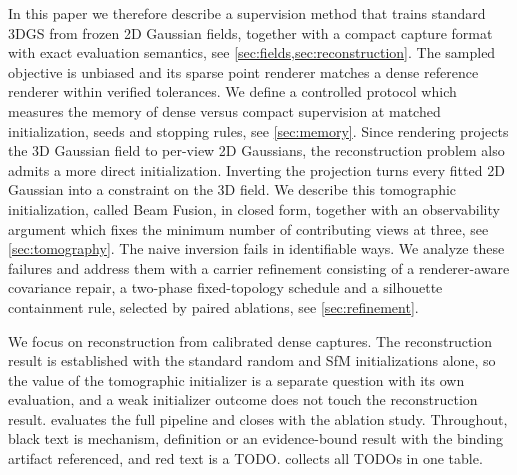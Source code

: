 In this paper we therefore describe a supervision method that trains standard 3DGS from
frozen 2D Gaussian fields, together with a compact capture format with exact evaluation
semantics, see \cref{sec:fields,sec:reconstruction}.  The sampled objective is unbiased
and its sparse point renderer matches a dense reference renderer within verified
tolerances.  We define a controlled protocol which measures the memory of dense versus
compact supervision at matched initialization, seeds and stopping rules, see
\cref{sec:memory}.  
Since rendering projects the 3D Gaussian field to per-view 2D Gaussians, the
reconstruction problem also admits a more direct initialization.  Inverting the projection
turns every fitted 2D Gaussian into a constraint on the 3D field.  We describe this
tomographic initialization, called Beam Fusion, in closed form, together with an
observability argument which fixes the minimum number of contributing views at three, see
\cref{sec:tomography}.  The naive inversion fails in identifiable ways.  We analyze these
failures and address them with a carrier refinement consisting of a renderer-aware
covariance repair, a two-phase fixed-topology schedule and a silhouette containment rule,
selected by paired ablations, see \cref{sec:refinement}.  

We focus on reconstruction from calibrated dense captures.  The reconstruction result is
established with the standard random and SfM initializations alone, so the value of the
tomographic initializer is a separate question with its own evaluation, and a weak
initializer outcome does not touch the reconstruction result.  
evaluates the full pipeline and closes with the ablation study.  Throughout, black text is
mechanism, definition or an evidence-bound result with the binding artifact referenced,
and red text is a TODO.   collects all TODOs in one table.
